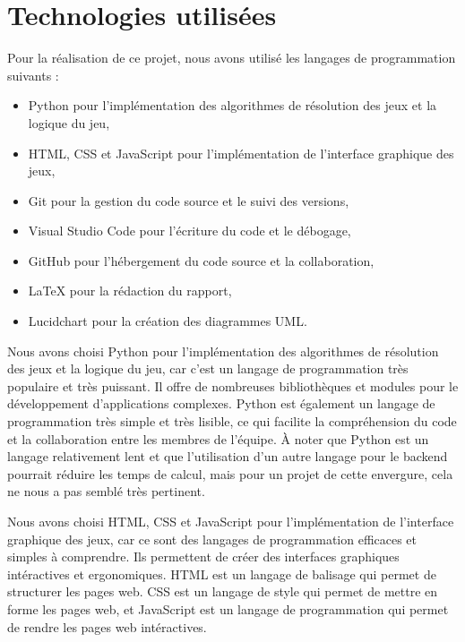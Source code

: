 \section{Technologies utilisées}

Pour la réalisation de ce projet, nous avons utilisé les langages de programmation suivants :
\begin{itemize}
	\item Python pour l'implémentation des algorithmes de résolution des jeux et la logique du jeu,
	\item HTML, CSS et JavaScript pour l'implémentation de l'interface graphique des jeux,
	\item Git pour la gestion du code source et le suivi des versions,
	\item Visual Studio Code pour l'écriture du code et le débogage,
	\item GitHub pour l'hébergement du code source et la collaboration,
	\item LaTeX pour la rédaction du rapport,
	\item Lucidchart pour la création des diagrammes UML.
\end{itemize}

Nous avons choisi Python pour l'implémentation des algorithmes de résolution des 
jeux et la logique du jeu, car c'est un langage de programmation très populaire et 
très puissant. Il offre de nombreuses bibliothèques et modules pour le 
développement d'applications complexes. 
Python est également un langage de programmation très simple et très lisible, 
ce qui facilite la compréhension du code et la collaboration entre les membres de 
l'équipe.
À noter que Python est un langage relativement lent et que l'utilisation d'un autre
langage pour le backend pourrait réduire les temps de calcul, mais pour un projet de cette envergure,
cela ne nous a pas semblé très pertinent.

Nous avons choisi HTML, CSS et JavaScript pour l'implémentation de l'interface
graphique des jeux, car ce sont des langages de programmation efficaces et 
simples à comprendre. Ils permettent de créer des interfaces graphiques intéractives 
et ergonomiques. HTML est un langage de balisage qui permet de structurer les pages
web. CSS est un langage de style qui permet de mettre en forme les pages web, et
JavaScript est un langage de programmation qui permet de rendre les pages web
intéractives.

